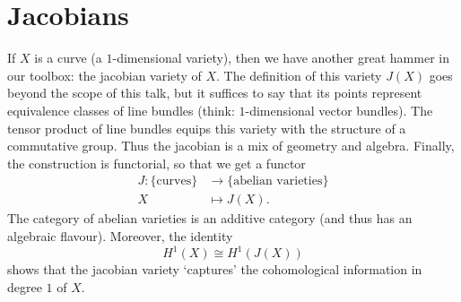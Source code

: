 \documentclass[a4paper,10pt]{article}
\begin{document}
\section{Jacobians}

If $X$ is a curve (a $1$-dimensional variety), then we have another great
hammer in our toolbox: the jacobian variety of $X$. The definition of this
variety $J(X)$ goes beyond the scope of this talk, but it suffices to say that
its points represent equivalence classes of line bundles (think:
$1$-dimensional vector bundles). The tensor product of line bundles equips this
variety with the structure of a commutative group. Thus the jacobian is a mix
of geometry and algebra. Finally, the construction is functorial, so that we
get a functor
\begin{align*} %
	J \colon \{\text{curves}\} &\to \{\text{abelian varieties}\} \\
	X &\mapsto J(X).
\end{align*} %
The category of abelian varieties is an additive category (and thus has an
algebraic flavour). Moreover, the identity
\[
	H^{1}(X) \cong H^{1}(J(X))
\]
shows that the jacobian variety `captures' the cohomological information in
degree $1$ of $X$.



\end{document}
